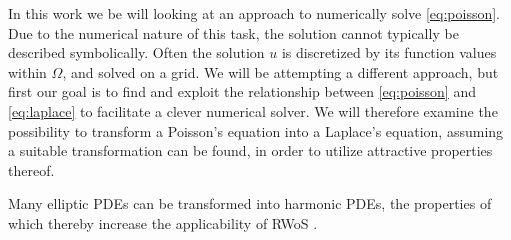 In this work we be will looking at an approach to numerically solve \eqref{eq:poisson}.
Due to the numerical nature of this task, the solution cannot typically be described symbolically.
Often the solution $u$ is discretized by its function values within $\Omega$, and solved on a grid.
We will be attempting a different approach, but first our goal is to find and exploit the relationship
between \eqref{eq:poisson} and \eqref{eq:laplace} to facilitate a clever numerical solver.
We will therefore examine the possibility to transform a Poisson's equation into
a Laplace's equation, assuming a suitable transformation can be found, in order to
utilize attractive properties thereof.

   Many elliptic \glspl{PDE} can be transformed into harmonic \glspl{PDE},
the properties of which thereby increase the applicability of \gls{RWoS} \cite{Bornemann}.
\newpage
